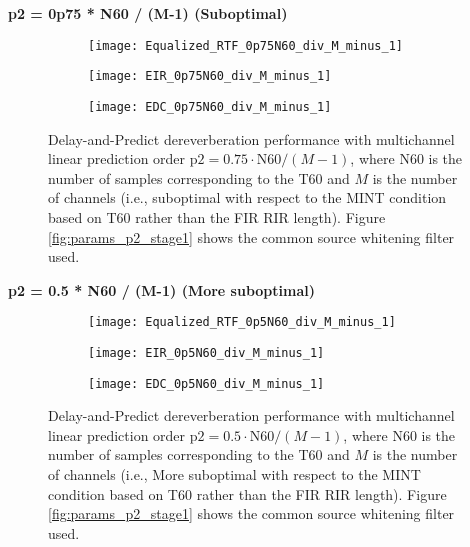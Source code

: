 \textbf{p2 = 0p75 * N60 / (M-1) (Suboptimal)}

\begin{figure}[H]
	\centering
	\begin{subfigure}[b]{0.32\textwidth}
		\centering
		\texttt{[image: Equalized\_RTF\_0p75N60\_div\_M\_minus\_1]}
	\end{subfigure}
	\hfill
	\begin{subfigure}[b]{0.32\textwidth}
		\centering
		\texttt{[image: EIR\_0p75N60\_div\_M\_minus\_1]}
	\end{subfigure}
	\hfill
	\begin{subfigure}[b]{0.32\textwidth}
		\centering
		\texttt{[image: EDC\_0p75N60\_div\_M\_minus\_1]}
	\end{subfigure}
	\hfill
	\caption{Delay-and-Predict dereverberation performance with multichannel linear prediction order $\mathrm{p2} = 0.75 \cdot \mathrm{N60} / (M-1)$, where N60 is the number of samples corresponding to the T60 and $M$ is the number of channels (i.e., suboptimal with respect to the MINT condition based on T60 rather than the FIR RIR length). Figure \ref{fig:params_p2_stage1} shows the common source whitening filter used.}
	\label{fig:params_p2_0p75_N60}
\end{figure}

\textbf{p2 = 0.5 * N60 / (M-1) (More suboptimal)}

\begin{figure}[H]
	\centering
	\begin{subfigure}[b]{0.32\textwidth}
		\centering
		\texttt{[image: Equalized\_RTF\_0p5N60\_div\_M\_minus\_1]}
	\end{subfigure}
	\hfill
	\begin{subfigure}[b]{0.32\textwidth}
		\centering
		\texttt{[image: EIR\_0p5N60\_div\_M\_minus\_1]}
	\end{subfigure}
	\hfill
	\begin{subfigure}[b]{0.32\textwidth}
		\centering
		\texttt{[image: EDC\_0p5N60\_div\_M\_minus\_1]}
	\end{subfigure}
	\hfill
	\caption{Delay-and-Predict dereverberation performance with multichannel linear prediction order $\mathrm{p2} = 0.5 \cdot \mathrm{N60} / (M-1)$, where N60 is the number of samples corresponding to the T60 and $M$ is the number of channels (i.e., More suboptimal with respect to the MINT condition based on T60 rather than the FIR RIR length). Figure \ref{fig:params_p2_stage1} shows the common source whitening filter used.}
	\label{fig:params_p2_0p5_N60}
\end{figure}

